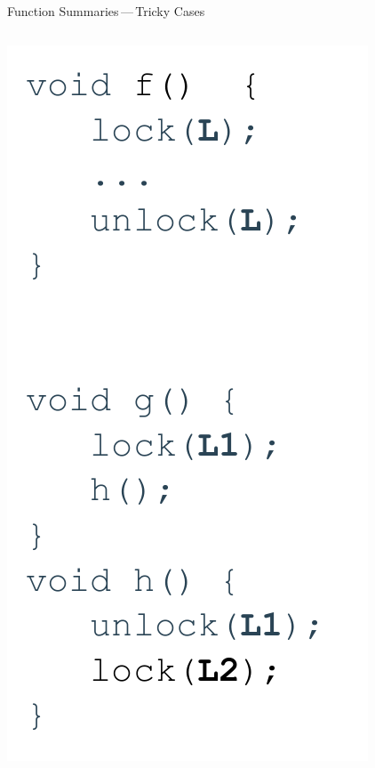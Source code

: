 \documentclass[10pt, xcolor=pdflatex, hyperref={unicode}, aspectratio=169]{beamer}
\begin{document}
\begin{frame}{Function Summaries\,---\,Tricky Cases}
\begin{columns}
        \begin{column}{.25 \linewidth}
            \includegraphics[scale=.5]{extSummL2D2.pdf}
        \end{column}
    \end{columns}
\end{frame}


\end{document}
